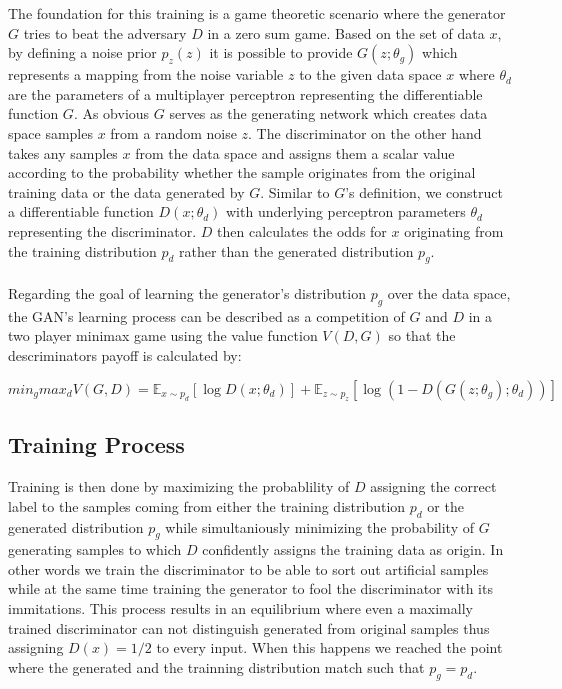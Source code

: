\documentclass[12pt]{article}
\begin{document}
  The foundation for this training is a game theoretic scenario where the generator \(  G  \) tries to beat the adversary \(  D  \) in a zero sum game.
  Based on the set of data \(  x  \), by defining a noise prior \(  p_z(z)  \) it is possible to provide \(  G(z; \theta_g)  \) which represents a mapping from the noise variable \(  z  \) to the given data space \( x \) where \( \theta_d \) are the parameters of a multiplayer perceptron representing the differentiable function \( G \).
  As obvious \( G \) serves as the generating network which creates data space samples \( x \) from a random noise \( z \).
  The discriminator on the other hand takes any samples \( x \) from the data space and assigns them a scalar value according to the probability whether the sample originates from the original training data or the data generated by \( G \).
  Similar to \( G \)'s definition, we construct a differentiable function \( D(x; \theta_d) \) with underlying perceptron parameters \( \theta_d \) representing the discriminator.
  \( D \) then calculates the odds for \( x \) originating from the training distribution \( p_d \) rather than the generated distribution \( p_g \).
  \\
  \\
  Regarding the goal of learning the generator's distribution \( p_g \) over the data space, the GAN's learning process can be described as a competition of \( G \) and \( D \) in a two player minimax game using the value function \( V(D,G) \) so that the descriminators payoff is calculated by:

  \[
  min_g max_d V(G,D) =  \mathbb{E}_{x \sim p_d}[\log D(x; \theta_d)] + \mathbb{E}_{z \sim p_z}[\log(1 - D(G(z; \theta_g); \theta_d))]
  \]

  \cite[Equation (1)]{1}

  \subsection{Training Process}

  Training is then done by maximizing the probablility of \( D \) assigning the correct label to the samples coming from either the training distribution \( p_d \) or the generated distribution \( p_g \) while simultaniously minimizing the probability of \( G \) generating samples to which \( D \) confidently assigns the training data as origin.
  In other words we train the discriminator to be able to sort out artificial samples while at the same time training the generator to fool the discriminator with its immitations.
  This process results in an equilibrium where even a maximally trained discriminator can not distinguish generated from original samples thus assigning \( D(x) = 1/2 \) to every input.
  When this happens we reached the point where the generated and the trainning distribution match such that \( p_g = p_d \).
\end{document}
